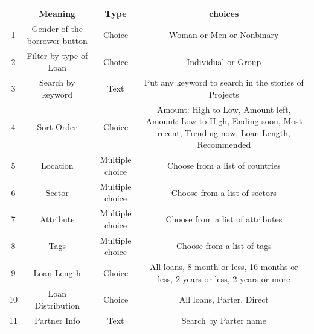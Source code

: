 \begin{table}[H]
	\centering
	\begin{tabular}{|c|c|c|c|}
		\hline
		   & Meaning                       & Type            & choices                                                                                                                 \\
		\hline
		1  & Gender of the borrower button & Choice          & Woman or Men or Nonbinary                                                                                               \\
		2  & Filter by type of Loan        & Choice          & Individual or Group                                                                                                     \\
		3  & Search by keyword             & Text            & Put any keyword to search in the stories of Projects                                                                    \\
		4  & Sort Order                    & Choice          & Amount: High to Low, Amount left, Amount: Low to High, Ending soon, Most recent, Trending now, Loan Length, Recommended \\
		5  & Location                      & Multiple choice & Choose from a list of countries                                                                                         \\
		6  & Sector                        & Multiple choice & Choose from a list of sectors                                                                                           \\
		7  & Attribute                     & Multiple choice & Choose from a list of attributes                                                                                        \\
		8  & Tags                          & Multiple choice & Choose from a list of tags                                                                                              \\
		9  & Loan Length                   & Choice          & All loans, 8 month or less, 16 months or less, 2 years or less, 2 years or more                                         \\
		10 & Loan Distribution             & Choice          & All loans, Parter, Direct                                                                                               \\
		11 & Partner Info                  & Text            & Search by Parter name                                                                                                   \\

\end{tabular}
\end{table}
